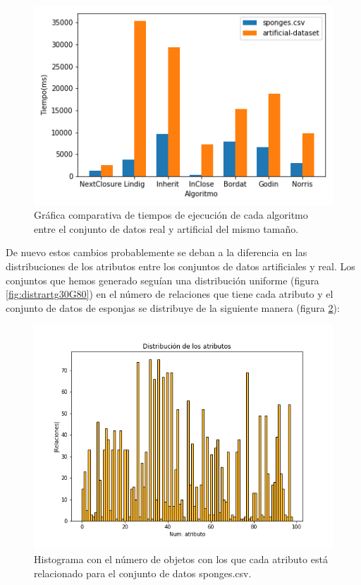 \documentclass[oneside,openright,titlepage,numbers=noenddot,openany,headinclude,footinclude=true,
cleardoublepage=empty,abstractoff,BCOR=5mm,paper=a4,fontsize=12pt,main=spanish]{scrreprt}
\begin{document}
\begin{itemize}
\begin{figure}[H]
  \centering
  \includegraphics[scale=0.6]{images/comparative-sponges.png}
  
\caption{Gráfica comparativa de tiempos de ejecución de cada algoritmo entre el conjunto de datos real y artificial del mismo tamaño. }
\label{fig:compsponges}
\end{figure}
\end{itemize}

De nuevo estos cambios probablemente se deban a la diferencia en las distribuciones de los atributos entre los conjuntos de datos artificiales y real. Los conjuntos que hemos generado seguían una distribución uniforme (figura \ref{fig:distrartg30G80}) en el número de relaciones que tiene cada atributo y el conjunto de datos de esponjas se distribuye de la siguiente manera (figura \ref{fig:dissponges}):

\begin{figure}[H]
  \centering
  \includegraphics[scale=0.5]{images/distribution-sponges.png}
\caption{Histograma con el número de objetos con los que cada atributo está relacionado para el conjunto de datos sponges.csv. }
  \label{fig:dissponges}

\end{figure}
\end{document}
